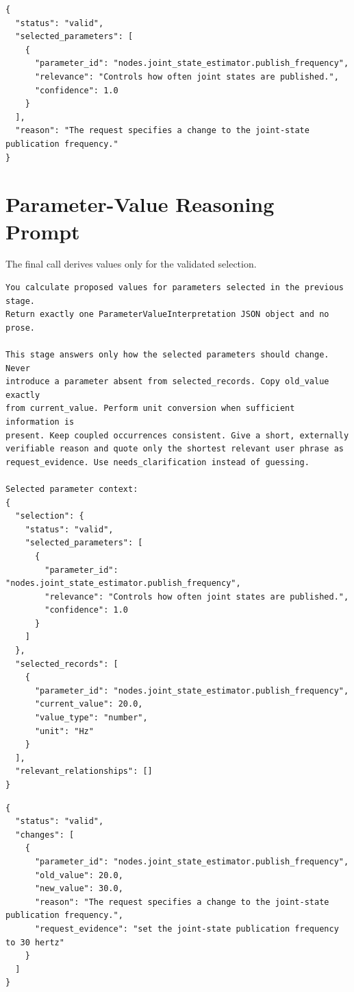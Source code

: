 \begin{lstlisting}[style=annexcode,language={},caption={Parameter selection returned by the model.},label={lst:selection-response}]
{
  "status": "valid",
  "selected_parameters": [
    {
      "parameter_id": "nodes.joint_state_estimator.publish_frequency",
      "relevance": "Controls how often joint states are published.",
      "confidence": 1.0
    }
  ],
  "reason": "The request specifies a change to the joint-state publication frequency."
}
\end{lstlisting}

\section{Parameter-Value Reasoning Prompt}

The final call derives values only for the validated selection.

\begin{lstlisting}[style=annexcode,caption={Representative parameter-value system message.},label={lst:value-system-prompt}]
You calculate proposed values for parameters selected in the previous stage.
Return exactly one ParameterValueInterpretation JSON object and no prose.

This stage answers only how the selected parameters should change. Never
introduce a parameter absent from selected_records. Copy old_value exactly
from current_value. Perform unit conversion when sufficient information is
present. Keep coupled occurrences consistent. Give a short, externally
verifiable reason and quote only the shortest relevant user phrase as
request_evidence. Use needs_clarification instead of guessing.

Selected parameter context:
{
  "selection": {
    "status": "valid",
    "selected_parameters": [
      {
        "parameter_id": "nodes.joint_state_estimator.publish_frequency",
        "relevance": "Controls how often joint states are published.",
        "confidence": 1.0
      }
    ]
  },
  "selected_records": [
    {
      "parameter_id": "nodes.joint_state_estimator.publish_frequency",
      "current_value": 20.0,
      "value_type": "number",
      "unit": "Hz"
    }
  ],
  "relevant_relationships": []
}

\end{lstlisting}

\begin{lstlisting}[style=annexcode,language={},caption={Parameter-value interpretation returned by the model.},label={lst:value-response}]
{
  "status": "valid",
  "changes": [
    {
      "parameter_id": "nodes.joint_state_estimator.publish_frequency",
      "old_value": 20.0,
      "new_value": 30.0,
      "reason": "The request specifies a change to the joint-state publication frequency.",
      "request_evidence": "set the joint-state publication frequency to 30 hertz"
    }
  ]
}
\end{lstlisting}
